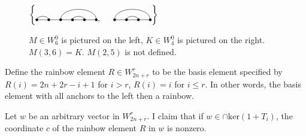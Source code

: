 \documentclass{amsart}
\begin{document}
\begin{figure} 
	\def\cbasisspacing{5mm}
	$\cbr{
		\begin{gathered}
		\Matching{6}{1/2, 3/6, 4/5}, \hspace{\cbasisspacing}
		\Matching{4}{1/4, 2/3}
		\end{gathered}}$
	\caption{$M\in W_6^0$ is pictured on the left, $K\in W_4^0$ is pictured on the right. $M(3,6)=K$. $M(2,5)$ is not defined.}
	\label{S6 Basis}
\end{figure}

Define the rainbow element $R\in W_{2n+r}^r$ to be the basis element specified by $R(i)=2n+2r-i+1$ for $i>r$, $R(i)=i$ for $i\leq r$. In other words, the basis element with all anchors to the left then a rainbow.

\begin{proposition}
	Let $w$ be an arbitrary vector in $W_{2n+r}^r$. I claim that if $w\in \cap\text{ker}(1+T_i)$, the coordinate $c$ of the rainbow element $R$ in $w$ is nonzero.
	
\end{proposition}	
\end{document}
